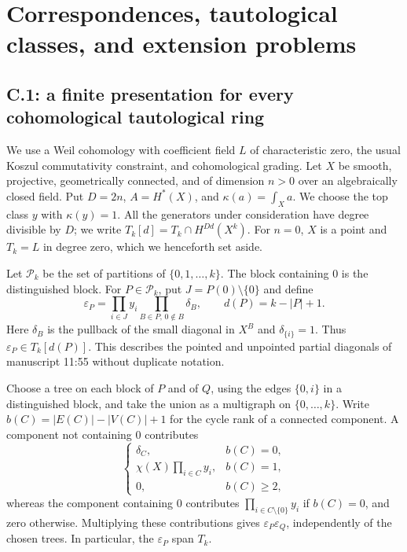 \section{Correspondences, tautological classes, and extension problems}
\label{sec:part-c}
\providecommand{\Lie}{\operatorname{Lie}}
\providecommand{\tr}{\operatorname{tr}}
\providecommand{\Alt}{\operatorname{Alt}}
\providecommand{\sgn}{\operatorname{sgn}}
\providecommand{\Gr}{\operatorname{Gr}}
\providecommand{\id}{\operatorname{id}}

\subsection{C.1: a finite presentation for every cohomological tautological ring}

We use a Weil cohomology with coefficient field $L$ of characteristic zero, the usual Koszul commutativity constraint, and cohomological grading. Let $X$ be smooth, projective, geometrically connected, and of dimension $n>0$ over an algebraically closed field. Put $D=2n$, $A=H^*(X)$, and $\kappa(a)=\int_Xa$. We choose the top class $y$ with $\kappa(y)=1$. All the generators under consideration have degree divisible by $D$; we write $T_k[d]=T_k\cap H^{Dd}(X^k)$. For $n=0$, $X$ is a point and $T_k=L$ in degree zero, which we henceforth set aside.

\begin{definition}
\label{c:def-pointed}
Let $\mathcal P_k$ be the set of partitions of $\{0,1,\ldots,k\}$. The block containing $0$ is the distinguished block. For $P\in\mathcal P_k$, put $J=P(0)\setminus\{0\}$ and define
\[
 \varepsilon_P=\prod_{i\in J}y_i\prod_{B\in P,\,0\notin B}\delta_B,
 \qquad d(P)=k-|P|+1.
\]
Here $\delta_B$ is the pullback of the small diagonal in $X^B$ and $\delta_{\{i\}}=1$. Thus $\varepsilon_P\in T_k[d(P)]$. This describes the pointed and unpointed partial diagonals of manuscript 11:55 without duplicate notation.
\end{definition}

\begin{theorem}
\label{c:graph-rule}
Choose a tree on each block of $P$ and of $Q$, using the edges $\{0,i\}$ in a distinguished block, and take the union as a multigraph on $\{0,\ldots,k\}$. Write $b(C)=|E(C)|-|V(C)|+1$ for the cycle rank of a connected component. A component not containing $0$ contributes
\[
 \begin{cases}
 \delta_C,&b(C)=0,\\
 \chi(X)\prod_{i\in C}y_i,&b(C)=1,\\
 0,&b(C)\geq2,
 \end{cases}
\]
whereas the component containing $0$ contributes $\prod_{i\in C\setminus\{0\}}y_i$ if $b(C)=0$, and zero otherwise. Multiplying these contributions gives $\varepsilon_P\varepsilon_Q$, independently of the chosen trees. In particular, the $\varepsilon_P$ span $T_k$.
\end{theorem}

